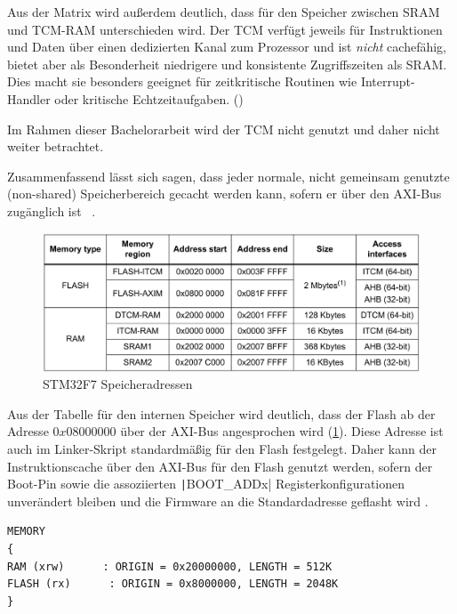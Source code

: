 Aus der Matrix wird außerdem deutlich, dass für den Speicher zwischen SRAM und
TCM-RAM unterschieden wird. Der \ac{TCM} verfügt jeweils für Instruktionen und
Daten über einen dedizierten Kanal zum Prozessor und ist \textit{nicht}
cachefähig, bietet aber als Besonderheit niedrigere und konsistente
Zugriffszeiten als SRAM. Dies macht sie besonders geeignet für zeitkritische
Routinen wie Interrupt-Handler oder kritische Echtzeitaufgaben.
(\cite{arm_den0042})

Im Rahmen dieser Bachelorarbeit wird der TCM nicht genutzt und daher nicht
weiter betrachtet.

Zusammenfassend lässt sich sagen, dass jeder normale, nicht gemeinsam genutzte
(non-shared) Speicherbereich gecacht werden kann, sofern er über den AXI-Bus
zugänglich ist \cite[S. 4]{an4839}~\cite[S. 7]{an4667}.

\begin{figure}[htb]
    \centering
    \includegraphics[width=1\textwidth]{assets/internal_mem_table}
    \caption{STM32F7 Speicheradressen \cite[S. 14]{an4667}}
    \label{fig:internal_mem_table}
\end{figure}

Aus der Tabelle für den internen Speicher wird deutlich, dass der Flash ab der
Adresse $0x0800 0000$ über der AXI-Bus angesprochen wird
(\ref{fig:internal_mem_table}). Diese Adresse ist auch im Linker-Skript
standardmäßig für den Flash festgelegt. Daher kann der Instruktionscache über
den AXI-Bus für den Flash genutzt werden, sofern der Boot-Pin sowie die
assoziierten \texttt|BOOT_ADDx| Registerkonfigurationen unverändert
bleiben und die Firmware an die Standardadresse geflasht wird \cite[S.
28]{stm32_datasheet}.

\begin{code}
\begin{verbatim}
MEMORY
{
RAM (xrw)      : ORIGIN = 0x20000000, LENGTH = 512K
FLASH (rx)      : ORIGIN = 0x8000000, LENGTH = 2048K
}
\end{verbatim}
\end{code}

